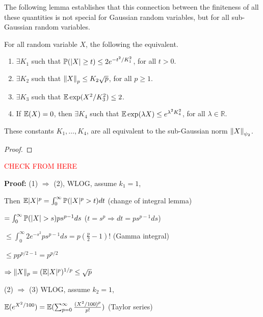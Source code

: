 \documentclass[12pt]{article}
\newcommand{\sr}[1]{\textcolor{red}{#1}}
\begin{document}
The following lemma establishes that this connection between the finiteness of all these quantities is not special for Gaussian random variables, but for all sub-Gaussian random variables.

\begin{lemma}
    For all random variable $X$, the following the equivalent.
    \begin{enumerate}
        \item $\exists K_1$ such that $\mathbb{P}(\left\lvert X \right\rvert \geq t) \leq 2 e^{-t^2/K_1^2}$, for all $t > 0$.
        \item $\exists K_2$ such that $\left\Vert X \right\Vert_p \leq K_2 \sqrt{p}$, for all $p \geq 1$.
        \item $\exists K_3$ such that $\mathbb{E}\exp(X^2/K_3^2) \leq 2$.
        \item If $\mathbb{E}(X) = 0$, then $\exists K_4$ such that $\mathbb{E}\exp(\lambda X) \leq e^{\lambda^2 K_4^2}$, for all $\lambda \in \mathbb{R}$.
    \end{enumerate}
    \noindent These constants $K_1, \dots, K_4$, are all equivalent to the sub-Gaussian norm $\left\Vert X \right\Vert_{\psi_2}$.
\end{lemma}

\begin{proof}

\end{proof}




\pagebreak
\sr{CHECK FROM HERE}



\textbf{Proof:} (1) $\Rightarrow$ (2), WLOG, assume $k_1 = 1$,

Then $\mathbb{E} |X|^p = \int_0^{\infty} \mathbb{P}(|X|^p > t) dt$ \hspace{2cm} (change of integral lemma)

$= \int_0^{\infty} \mathbb{P}(|X| > s) ps^{p-1} ds$ \hspace{1.5cm} ($t = s^p \Rightarrow dt = ps^{p-1} ds$)

$\leq \int_0^{\infty} 2e^{-s^2} ps^{p-1} ds = p (\frac{p}{2}-1)!$ \hspace{1cm} (Gamma integral)

$\leq p p^{p/2-1} = p^{p/2}$

$\Rightarrow \|X\|_p = (\mathbb{E}|X|^p)^{1/p} \leq \sqrt{p}$

(2) $\Rightarrow$ (3) WLOG, assume $k_2 = 1$,

$\mathbb{E}(e^{X^2/100}) = \mathbb{E}(\sum_{p=0}^{\infty} \frac{(X^2/100)^p}{p!})$ \hspace{2cm} (Taylor series)
\end{document}
